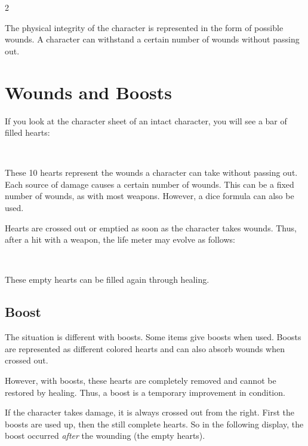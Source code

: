 \label{ch:wounds}

\begin{multicols}{2}

The physical integrity of the character is represented in the form of possible wounds. A character can withstand a certain number of wounds without passing out.

\section{Wounds and Boosts}

If you look at the character sheet of an intact character, you will see a bar of filled hearts:

\textcolor{red}{\large{}~~~~~~~~~}

These 10 hearts represent the wounds a character can take without passing out. Each source of damage causes a certain number of wounds. This can be a fixed number of wounds, as with most weapons. However, a dice formula can also be used.

Hearts are crossed out or emptied as soon as the character takes wounds. Thus, after a hit with a weapon, the life meter may evolve as follows:

\textcolor{red}{\large{}~~~~~~~~~}

These empty hearts can be filled again through healing.

\subsection{Boost}

The situation is different with boosts. Some items give boosts when used. Boosts are represented as different colored hearts and can also absorb wounds when crossed out.

However, with boosts, these hearts are completely removed and cannot be restored by healing. Thus, a boost is a temporary improvement in condition.

If the character takes damage, it is always crossed out from the right. First the boosts are used up, then the still complete hearts. So in the following display, the boost occurred \textit{after} the wounding (the empty hearts).


\end{multicols}
